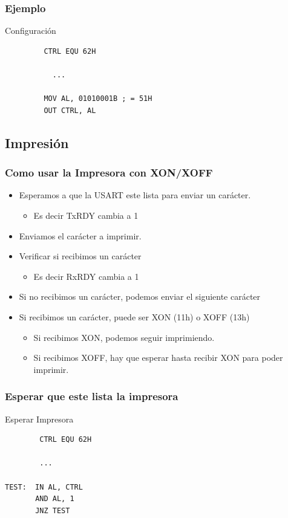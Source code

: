 \documentclass{beamer}
\begin{document}
\begin{frame}[fragile]
\frametitle{Ejemplo}
\begin{block}{Configuración}
 \begin{verbatim}
         CTRL EQU 62H
         
           ...
           
         MOV AL, 01010001B ; = 51H
         OUT CTRL, AL
 \end{verbatim}
\end{block}

\end{frame}

\subsection{Impresión}
\begin{frame}[fragile]
\frametitle{Como usar la Impresora con XON/XOFF}

\begin{itemize}
\item Esperamos a que la USART este lista para enviar un carácter. 
\begin{itemize}
\item Es decir TxRDY cambia a 1 
\end{itemize}
\item Enviamos el carácter a imprimir. 
\item Verificar si recibimos un carácter
\begin{itemize}
 \item Es decir RxRDY cambia a 1
\end{itemize}
\item Si no recibimos un carácter, podemos enviar el siguiente carácter
\item Si recibimos un carácter, puede ser XON (11h) o XOFF (13h)
\begin{itemize}
\item Si recibimos XON, podemos seguir imprimiendo.
\item Si recibimos XOFF, hay que esperar hasta recibir XON para poder imprimir.
\end{itemize}
\end{itemize}

\end{frame}

\begin{frame}[fragile]
\frametitle{Esperar que este lista la impresora}
\begin{block}{Esperar Impresora}
 \begin{verbatim}
        CTRL EQU 62H
         
        ...
           
TEST:  IN AL, CTRL
       AND AL, 1
       JNZ TEST
             
 \end{verbatim}
\end{block}

\end{frame}
\end{document}
